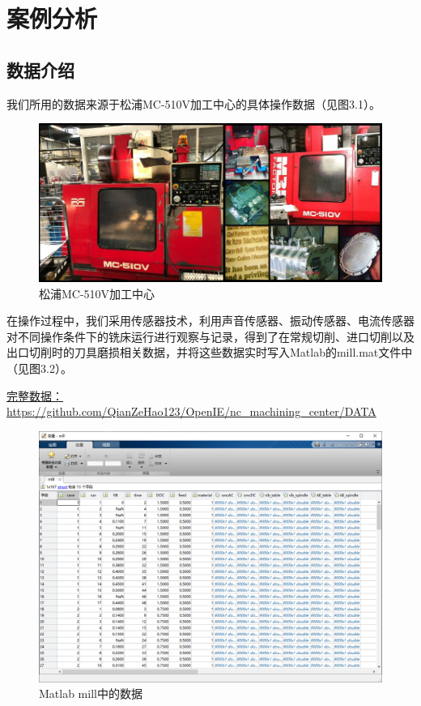 \chapter{案例分析}
\section{数据介绍}
我们所用的数据来源于松浦MC-510V加工中心的具体操作数据（见图3.1）。\par
% 
\begin{figure}[htp]
    \centering
    \includegraphics[width=14cm]{Chapter3/machine.png}
    \caption{松浦MC-510V加工中心}
\end{figure}
% 
% 
在操作过程中，我们采用传感器技术，利用声音传感器、振动传感器、电流传感器对不同操作条件下的铣床运行进行观察与记录，得到了在常规切削、进口切削以及出口切削时的刀具磨损相关数据，并将这些数据实时写入Matlab的mill.mat文件中（见图3.2）。\par
\href{https://github.com/QianZeHao123/OpenIE/tree/main/nc_machining_center/DATA}{完整数据：https://github.com/QianZeHao123/OpenIE/nc\_machining\_center/DATA}\par
% 
\begin{figure}[htp]
    \centering
    \includegraphics[width=14cm]{Chapter2/mill.png}
    \caption{Matlab mill中的数据}
\end{figure}
% 
% 
% 
